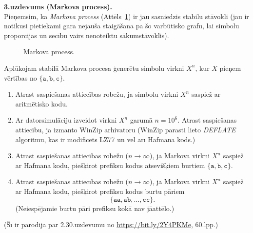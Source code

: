 \documentclass[a4paper,12pt]{article}
\begin{document}
\vspace{10pt}
{\bf 3.uzdevums (Markova process).}\\
Pieņemsim, ka {\em Markova process} (Attēls~\ref{fig:markov-chain})
ir jau sasniedzis stabilu stāvokli
(jau ir notikusi pietiekami gara nejauša staigāšana pa šo varbūtisko grafu, lai
simbolu proporcijas un secību vairs nenoteiktu sā\-kum\-stā\-vok\-lis).


\begin{figure}[!htb]
\caption{\label{fig:markov-chain} Markova process.}
\end{figure}

Aplūkojam stabilā Markova procesa ģenerētu simbolu virkni $X^n$, kur
$X$ pieņem vērtības no $\{\mathtt{a}, \mathtt{b}, \mathtt{c}\}$.

\begin{enumerate}
\item Atrast saspiešanas attiecības robežu, ja simbolu virkni $X^n$ saspiež ar
aritmētisko kodu.
\item Ar datorsimulāciju izveidot virkni $X^n$ garumā $n = 10^6$.
Atrast saspiešanas attiecību, ja izmanto WinZip arhivatoru
(WinZip parasti lie\-to {\em DEFLATE} algoritmu, kas ir modificēts LZ77 un
vēl arī Hafmana kods.)
\item Atrast saspiešanas attiecības robežu ($n \rightarrow \infty$),
ja Markova virkni $X^n$ saspiež ar Hafmana kodu,
piešķirot prefiksu kodus atsevišķiem burtiem $\{\mathtt{a}, \mathtt{b}, \mathtt{c}\}$.
\item Atrast saspiešanas attiecības robežu ($n \rightarrow \infty$),
ja Markova virkni $X^n$ saspiež ar Hafmana kodu, piešķirot prefiksu kodus
burtu pāriem
$$\{\mathtt{aa}, \mathtt{ab}, \ldots, \mathtt{cc}\}.$$
(Neiespējamie burtu pāri prefiksu kokā nav jāattēlo.)
\end{enumerate}

(Šī ir parodija par 2.30.uzdevumu no \url{https://bit.ly/2Y4PKMe}, 60.lpp.)
\end{document}
